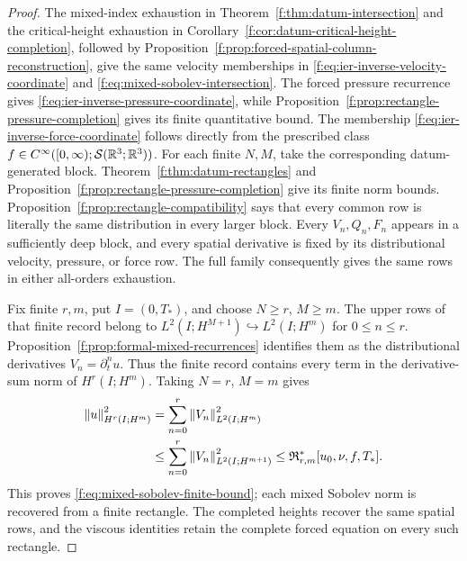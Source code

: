 \begin{proof}
The mixed-index exhaustion in Theorem~\ref{f:thm:datum-intersection} and the
critical-height exhaustion in
Corollary~\ref{f:cor:datum-critical-height-completion}, followed by
Proposition~\ref{f:prop:forced-spatial-column-reconstruction}, give the same
velocity memberships in \eqref{f:eq:ier-inverse-velocity-coordinate} and
\eqref{f:eq:mixed-sobolev-intersection}.  The forced pressure recurrence gives
\eqref{f:eq:ier-inverse-pressure-coordinate}, while
Proposition~\ref{f:prop:rectangle-pressure-completion} gives its finite
quantitative bound.
The membership \eqref{f:eq:ier-inverse-force-coordinate} follows directly from
the prescribed class
\(f\in C^\infty([0,\infty);\mathcal S(\mathbb R^3;\mathbb R^3))\).
For each finite \(N,M\), take the corresponding datum-generated block.
Theorem~\ref{f:thm:datum-rectangles} and
Proposition~\ref{f:prop:rectangle-pressure-completion} give its finite norm
bounds.  Proposition~\ref{f:prop:rectangle-compatibility} says that every
common row is literally the same distribution in every larger block.
Every \(V_n,Q_n,F_n\) appears in a sufficiently deep block, and every
spatial derivative is fixed by its distributional velocity, pressure, or force
row.  The full family consequently gives the same rows in either all-orders
exhaustion.

Fix finite \(r,m\), put \(I=(0,T_*)\), and choose \(N\ge r\),
\(M\ge m\). The upper rows of that finite record belong to
\(L^2(I;H^{M+1})\hookrightarrow L^2(I;H^m)\) for \(0\le n\le r\).
Proposition~\ref{f:prop:formal-mixed-recurrences} identifies them as the
distributional derivatives \(V_n=\partial_t^nu\). Thus the finite record
contains every term in the derivative-sum norm of \(H^r(I;H^m)\).
Taking \(N=r\), \(M=m\) gives
\[
 \begin{aligned}
 \left\lVert u\right\rVert_{H^r(I;H^m)}^2
 &=\sum_{n=0}^r\left\lVert V_n\right\rVert_{L^2(I;H^m)}^2\\
 &\le\sum_{n=0}^r\left\lVert V_n\right\rVert_{L^2(I;H^{m+1})}^2
 \le\mathfrak R_{r,m}^*[u_0,\nu,f,T_*].
 \end{aligned}
\]
This proves \eqref{f:eq:mixed-sobolev-finite-bound}; each mixed Sobolev norm is
recovered from a finite rectangle.  The completed heights recover the
same spatial rows, and the viscous identities retain the complete forced
equation on every such rectangle.
\end{proof}

